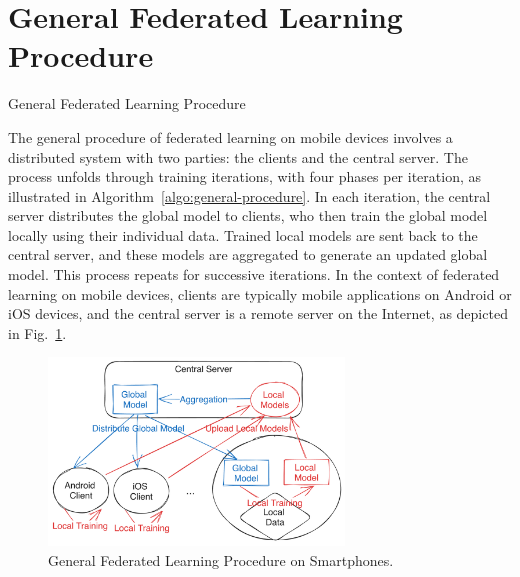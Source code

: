 \section{General Federated Learning Procedure}

\begin{algorithm}
    \caption{General Federated Learning Procedure}
    \label{algo:general-procedure}
\end{algorithm}

The general procedure of federated learning on mobile devices involves a
distributed system with two parties: the clients and the central server.
The process unfolds through training iterations, with four phases per iteration,
as illustrated in Algorithm~\ref{algo:general-procedure}. In each iteration,
the central server distributes the global model to clients,
who then train the global model locally using their individual data.
Trained local models are sent back to the central server,
and these models are aggregated to generate an updated global model.
This process repeats for successive iterations.
In the context of federated learning on mobile devices,
clients are typically mobile applications on Android or iOS devices,
and the central server is a remote server on the Internet,
as depicted in Fig.~\ref{fig:general-fl}.

\begin{figure}\begin{center}
\includegraphics[width=0.7\textwidth]{general_fl.png}
    \caption{General Federated Learning Procedure on Smartphones.}
    \label{fig:general-fl}
\end{center}\end{figure}

